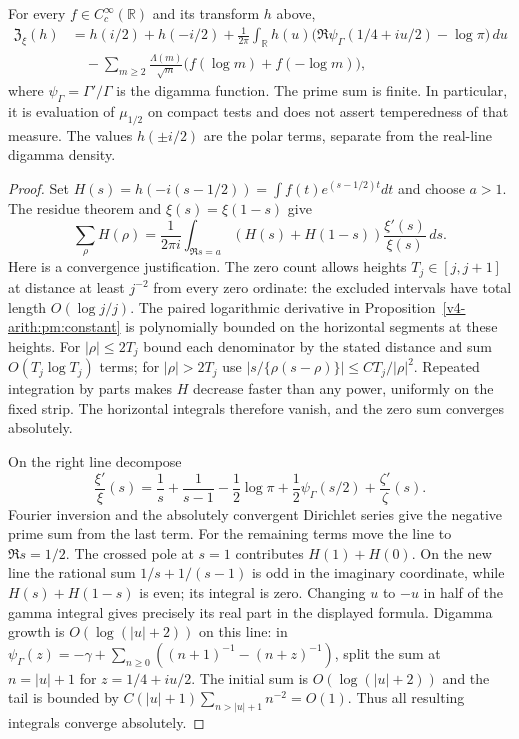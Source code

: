 \begin{theorem}
\label{v4-arith:pm:weil}
For every $f\in C_c^\infty(\mathbb R)$ and its transform $h$ above,
\begin{align*}
 \mathfrak Z_\xi(h)
 &=h(i/2)+h(-i/2)
   +\frac1{2\pi}\int_{\mathbb R}
       h(u)\bigl(\Re\psi_\Gamma(1/4+iu/2)-\log\pi\bigr)\,du\\
 &\quad-\sum_{m\geq2}\frac{\Lambda(m)}{\sqrt m}
                  \bigl(f(\log m)+f(-\log m)\bigr),
\end{align*}
where $\psi_\Gamma=\Gamma'/\Gamma$ is the digamma function.
The prime sum is finite. In particular, it is evaluation of
$\mu_{1/2}$ on compact tests and does not assert temperedness of
that measure. The values $h(\pm i/2)$ are the polar terms, separate
from the real-line digamma density.
\end{theorem}
\begin{proof}
Set $H(s)=h(-i(s-1/2))=\int f(t)e^{(s-1/2)t}dt$ and choose $a>1$.
The residue theorem and $\xi(s)=\xi(1-s)$ give
\[
 \sum_\rho H(\rho)
 =\frac1{2\pi i}\int_{\Re s=a}
             (H(s)+H(1-s))\frac{\xi'(s)}{\xi(s)}\,ds.
\]
Here is a convergence justification. The zero count allows heights
$T_j\in[j,j+1]$ at distance at least $j^{-2}$ from every zero
ordinate: the excluded intervals have total length $O(\log j/j)$.
The paired logarithmic derivative in
Proposition~\ref{v4-arith:pm:constant} is polynomially bounded on
the horizontal segments at these heights. For $|\rho|\leq2T_j$
bound each denominator by the stated distance and sum
$O(T_j\log T_j)$ terms; for $|\rho|>2T_j$ use
$|s/\{\rho(s-\rho)\}|\leq C T_j/|\rho|^2$.
Repeated integration by parts makes $H$ decrease faster than any
power, uniformly on the fixed strip. The horizontal integrals
therefore vanish, and the zero sum converges absolutely.

On the right line decompose
\[
 \frac{\xi'}\xi(s)
 =\frac1s+\frac1{s-1}-\frac12\log\pi
       +\frac12\psi_\Gamma(s/2)+\frac{\zeta'}\zeta(s).
\]
Fourier inversion and the absolutely convergent Dirichlet series
give the negative prime sum from the last term. For the remaining
terms move the line to $\Re s=1/2$. The crossed pole at $s=1$
contributes $H(1)+H(0)$. On the new line the rational sum
$1/s+1/(s-1)$ is odd in the imaginary coordinate, while
$H(s)+H(1-s)$ is even; its integral is zero. Changing $u$ to $-u$
in half of the gamma integral gives precisely its real part in the
displayed formula. Digamma growth is $O(\log(|u|+2))$ on this
line: in
$\psi_\Gamma(z)=-\gamma+\sum_{n\geq0}((n+1)^{-1}-(n+z)^{-1})$,
split the sum at $n=|u|+1$ for $z=1/4+iu/2$. The initial sum
is $O(\log(|u|+2))$ and the tail is bounded by
$C(|u|+1)\sum_{n>|u|+1}n^{-2}=O(1)$.
Thus all resulting integrals converge absolutely.
\end{proof}

